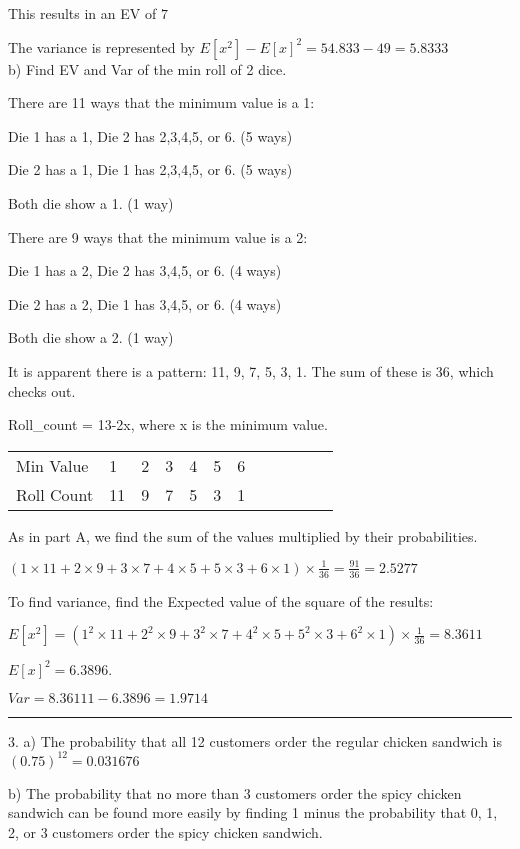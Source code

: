 \documentclass{article}
\begin{document}
This results in an EV of $\boxed{7}$


	The variance is represented by $E[x^2] - E[x]^2 = 54.833 - 49 = \boxed{5.8333} $
\\
b) Find EV and Var of the min roll of 2 dice. 

There are 11 ways that the minimum value is a 1: 

Die 1 has a 1, Die 2 has 2,3,4,5, or 6. (5 ways)

Die 2 has a 1, Die 1 has 2,3,4,5, or 6. (5 ways)

Both die show a 1. (1 way)

There are 9 ways that the minimum value is a 2: 

Die 1 has a 2, Die 2 has 3,4,5, or 6. (4 ways)

Die 2 has a 2, Die 1 has 3,4,5, or 6. (4 ways)

Both die show a 2. (1 way)

It is apparent there is a pattern: 11, 9, 7, 5, 3, 1. The sum of these is 36, which checks out. 

Roll\_{count} = 13-2x, where x is the minimum value. 

\begin{table}[h]
\begin{tabular}{llllllllllll}
Min Value  & 1 & 2 & 3 & 4 & 5 & 6 \\
Roll Count & 11 & 9 & 7 & 5 & 3 & 1  
\end{tabular}
\end{table}


As in part A, we find the sum of the values multiplied by their probabilities. 

$(1\times11 + 2\times9 + 3\times7 + 4\times5 + 5\times3 + 6\times1) \times \frac{1}{36} = \frac{91}{36} =\boxed{2.5277}$


To find variance, find the Expected value of the square of the results:

$E[x^2] = (1^2\times11 + 2^2\times9 + 3^2\times7 + 4^2\times5 + 5^2\times3 + 6^2\times1) \times \frac{1}{36} = 8.3611$

$E[x]^2 = 6.3896. $

$Var = 8.36111-6.3896 = \boxed{1.9714}$



\noindent\rule{8cm}{0.4pt}

3. a) The probability that all 12 customers order the regular chicken sandwich is $(0.75)^{12} = \boxed{0.031676}$ 


b) The probability that no more than 3 customers order the spicy chicken sandwich can be found more easily by finding 1 minus the probability that 0, 1, 2, or 3 customers order the spicy chicken sandwich. 
\end{document}
